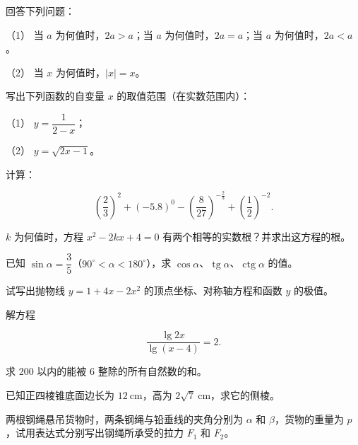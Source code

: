 \begin{question}
回答下列问题：

（1） 当 $a$ 为何值时，$2a>a$；当 $a$ 为何值时，$2a=a$；当 $a$ 为何值时，$2a<a$。

（2） 当 $x$ 为何值时，$|x|=x$。

\end{question}
\begin{question}
写出下列函数的自变量 $x$ 的取值范围（在实数范围内）：

（1） $y=\dfrac{1}{2-x}$；

（2） $y=\sqrt{2x-1}$。

\end{question}
\begin{question}
计算：

\nopagebreak[4]
\[
\left(\frac{2}{3}\right)^{2}+(-5.8)^{0}-\left(\frac{8}{27}\right)^{-\frac{2}{3}}+\left(\frac{1}{2}\right)^{-2}.
\]

\end{question}
\begin{question}
$k$ 为何值时，方程 $x^{2}-2kx+4=0$ 有两个相等的实数根？并求出这方程的根。

\end{question}
\begin{question}
已知 $\sin\alpha=\dfrac{3}{5}$（$90^\circ<\alpha<180^\circ$），求 $\cos\alpha$、$\operatorname{tg}\alpha$、$\operatorname{ctg}\alpha$ 的值。

\end{question}
\begin{question}
试写出抛物线 $y=1+4x-2x^{2}$ 的顶点坐标、对称轴方程和函数 $y$ 的极值。

\end{question}
\begin{question}
解方程

\nopagebreak[4]
\[
\frac{\lg 2x}{\lg(x-4)}=2.
\]

\end{question}
\begin{question}
求 200 以内的能被 6 整除的所有自然数的和。

\end{question}
\begin{question}
已知正四棱锥底面边长为 $12\ \mathrm{cm}$，高为 $2\sqrt{7}\ \mathrm{cm}$，求它的侧棱。

\end{question}
\begin{question}
两根钢绳悬吊货物时，两条钢绳与铅垂线的夹角分别为 $\alpha$ 和 $\beta$，货物的重量为 $p$，试用表达式分别写出钢绳所承受的拉力 $F_1$ 和 $F_2$。

\end{question}